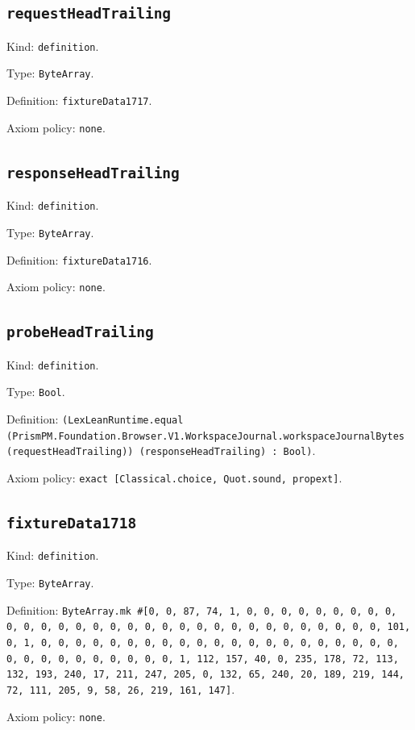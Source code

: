 \documentclass[11pt]{article}
\begin{document}
\subsection*{\texttt{requestHeadTrailing}}
\noindent Kind: \texttt{definition}.\par
\noindent Type: \texttt{ByteArray}.\par
\noindent Definition: \texttt{fixtureData1717}.\par
\noindent Axiom policy: \texttt{none}.\par
\subsection*{\texttt{responseHeadTrailing}}
\noindent Kind: \texttt{definition}.\par
\noindent Type: \texttt{ByteArray}.\par
\noindent Definition: \texttt{fixtureData1716}.\par
\noindent Axiom policy: \texttt{none}.\par
\subsection*{\texttt{probeHeadTrailing}}
\noindent Kind: \texttt{definition}.\par
\noindent Type: \texttt{Bool}.\par
\noindent Definition: \texttt{(LexLeanRuntime.equal (PrismPM.Foundation.Browser.V1.WorkspaceJournal.workspaceJournalBytes (requestHeadTrailing)) (responseHeadTrailing) : Bool)}.\par
\noindent Axiom policy: \texttt{exact [Classical.choice, Quot.sound, propext]}.\par
\subsection*{\texttt{fixtureData1718}}
\noindent Kind: \texttt{definition}.\par
\noindent Type: \texttt{ByteArray}.\par
\noindent Definition: \texttt{ByteArray.mk \#[0, 0, 87, 74, 1, 0, 0, 0, 0, 0, 0, 0, 0, 0, 0, 0, 0, 0, 0, 0, 0, 0, 0, 0, 0, 0, 0, 0, 0, 0, 0, 0, 0, 0, 0, 0, 101, 0, 1, 0, 0, 0, 0, 0, 0, 0, 0, 0, 0, 0, 0, 0, 0, 0, 0, 0, 0, 0, 0, 0, 0, 0, 0, 0, 0, 0, 0, 0, 0, 0, 1, 112, 157, 40, 0, 235, 178, 72, 113, 132, 193, 240, 17, 211, 247, 205, 0, 132, 65, 240, 20, 189, 219, 144, 72, 111, 205, 9, 58, 26, 219, 161, 147]}.\par
\noindent Axiom policy: \texttt{none}.\par
\end{document}
